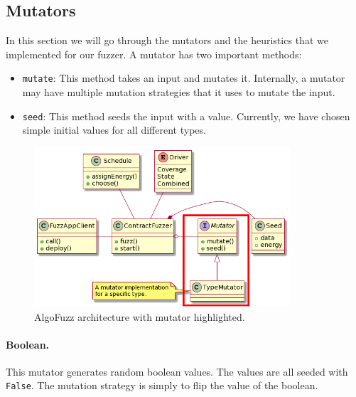\subsection*{Mutators} \label{section:mutators}
In this section we will go through the mutators and the heuristics that we implemented for our fuzzer.
A mutator has two important methods:
\begin{itemize}
    \item \texttt{mutate}: This method takes an input and mutates it.
          Internally, a mutator may have multiple mutation strategies that it uses to mutate the input.
    \item \texttt{seed}: This method seeds the input with a value.
          Currently, we have chosen simple initial values for all different types.
\end{itemize}


\begin{figure}[htbp]
    \centering
    \includegraphics[width=0.85\textwidth]{figures/arc-mutator-r.png}
    \caption{AlgoFuzz architecture with mutator highlighted.}\label{fig:architecture-mutator}
\end{figure}

\paragraph{Boolean.} This mutator generates random boolean values. The values are all seeded with \texttt{False}.
The mutation strategy is simply to flip the value of the boolean.

